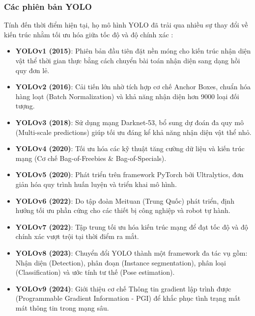 \subsubsection{Các phiên bản YOLO}

Tính đến thời điểm hiện tại, họ mô hình YOLO đã trải qua nhiều sự thay đổi về kiến trúc nhằm tối ưu hóa giữa tốc độ và độ chính xác \cite{ultralytics}:
\begin{itemize}
	\item \textbf{YOLOv1 (2015)}: Phiên bản đầu tiên đặt nền móng cho kiến trúc nhận diện vật thể thời gian thực bằng cách chuyển bài toán nhận diện sang dạng hồi quy đơn lẻ.
	
	\item \textbf{YOLOv2 (2016)}: Cải tiến lớn nhờ tích hợp cơ chế Anchor Boxes, chuẩn hóa hàng loạt (Batch Normalization) và khả năng nhận diện hơn 9000 loại đối tượng.
	
	\item \textbf{YOLOv3 (2018)}: Sử dụng mạng Darknet-53, bổ sung dự đoán đa quy mô (Multi-scale predictions) giúp tối ưu đáng kể khả năng nhận diện vật thể nhỏ.
	
	\item \textbf{YOLOv4 (2020)}: Tối ưu hóa các kỹ thuật tăng cường dữ liệu và kiến trúc mạng (Cơ chế Bag-of-Freebies \& Bag-of-Specials).
	
	\item \textbf{YOLOv5 (2020)}: Phát triển trên framework PyTorch bởi Ultralytics, đơn giản hóa quy trình huấn luyện và triển khai mô hình.
	
	\item \textbf{YOLOv6 (2022)}: Do tập đoàn Meituan (Trung Quốc) phát triển, định hướng tối ưu phần cứng cho các thiết bị công nghiệp và robot tự hành.
	
	\item \textbf{YOLOv7 (2022)}: Tập trung tối ưu hóa kiến trúc mạng để đạt tốc độ và độ chính xác vượt trội tại thời điểm ra mắt.
	
	\item \textbf{YOLOv8 (2023)}: Chuyển đổi YOLO thành một framework đa tác vụ gồm: Nhận diện (Detection), phân đoạn (Instance segmentation), phân loại (Classification) và ước tính tư thế (Pose estimation).
	
	\item \textbf{YOLOv9 (2024)}: Giới thiệu cơ chế Thông tin gradient lập trình được (Programmable Gradient Information - PGI) để khắc phục tình trạng mất mát thông tin trong mạng sâu.
	

\end{itemize}
